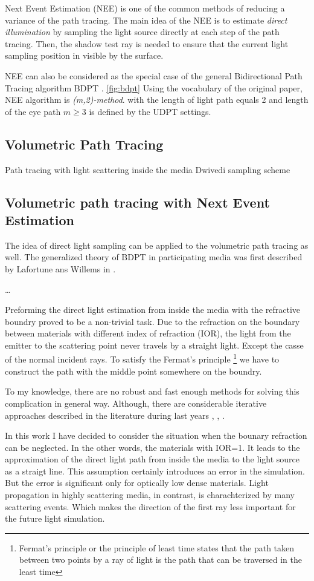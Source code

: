 Next Event Estimation (\gls{NEE}) is one of the common methods of reducing a
variance of the path tracing. The main idea of the \gls{NEE} is to estimate
\textit{direct illumination} by sampling the light source directly at each step
of the path tracing. Then, the shadow test ray is needed to ensure that the
current light sampling position in visible by the surface.

\gls{NEE} can also be considered as the special case of the general
Bidirectional Path Tracing algorithm \gls{BDPT} \cite{Veach:94:BDPT}.
\ref{fig:bdpt} Using the vocabulary of the original paper, NEE algorithm is
\textit{(m,2)-method}. with the length of light path equals 2 and length of the eye path $m\geq3$ is defined by
the \gls{UDPT} settings.

\subsection{Volumetric Path Tracing}
Path tracing with light scattering inside the media
Dwivedi sampling scheme

\subsection{Volumetric path tracing with Next Event Estimation}
The idea of direct light sampling can be applied to the volumetric path tracing
as well.
The generalized theory of \gls{BDPT} in participating media was first described
by Lafortune ans Willems in \cite{Lafortune:1996:RPM:275458.275468}. 

\ldots

Preforming the direct light estimation from inside the media with the refractive
boundry proved to be a non-trivial task.
Due to the refraction on the boundary between materials with different index of
refraction (\gls{IOR}), the light from the emitter to the scattering point never
travels by a straight light. Except the casse of the normal incident rays. To
satisfy the Fermat's principle
\footnote{Fermat's principle or the principle of least time states that the path taken between two points by a ray of light is the path that can be traversed in the least time}
we have to construct the path with the middle point somewhere on the boundry.

To my knowledge, there are no robust and fast enough methods for solving this
complication in general way. Although, there are considerable iterative
approaches described in the literature during last years
\cite{holzschuch:hal-01083246}, \cite{10.1111:cgf.12681}, \cite{Koerner2016}.

In this work I have decided to consider the situation when the bounary
refraction can be neglected. In the other words, the materials with \gls{IOR}=1.
It leads to the approximation of the direct light path from inside the media to the light source as a straigt line. This assumption certainly
introduces an error in the simulation. But the error is significant only for
optically low dense materials. Light propagation in highly scattering media, in
contrast, is charachterized by many scattering events. Which makes the direction
of the first ray less important for the future light simulation.


